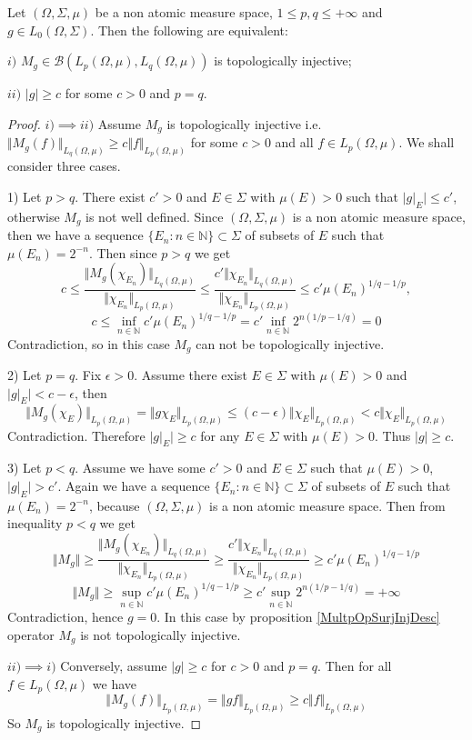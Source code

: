 \begin{proposition}\label{TopInjMultOpCharacOnNonAtomMeasSp} Let $(\Omega,\Sigma,\mu)$ be a non atomic measure space, $1\leq p,q\leq +\infty$ and $g\in L_0(\Omega,\Sigma)$. Then the following are equivalent:

$i)$ $M_g\in\mathcal{B}(L_p(\Omega,\mu),L_q(\Omega,\mu))$ is topologically injective;

$ii)$ $|g|\geq c$ for some $c>0$ and $p=q$.
\end{proposition}
\begin{proof}
$i)$$\implies$$ ii)$ Assume $M_g$ is topologically injective i.e. $\Vert M_g(f)\Vert_{L_q(\Omega,\mu)}\geq c\Vert f\Vert_{L_p(\Omega,\mu)}$ for some $c>0$ and all $f\in L_p(\Omega,\mu)$. We shall consider three cases.

1)  Let $p>q$. There exist $c'>0$ and $E\in\Sigma$ with $\mu(E)>0$ such that $|g|_E|\leq c'$, otherwise $M_g$ is not well defined. Since $(\Omega,\Sigma,\mu)$ is a non atomic measure space, then we have a sequence $\{E_n:n\in\mathbb{N}\}\subset\Sigma$ of subsets of $E$ such that $\mu(E_n)=2^{-n}$. Then since $p>q$ we get
$$
c
\leq\frac{\Vert M_g(\chi_{E_n})\Vert_{L_q(\Omega,\mu)}}{\Vert \chi_{E_n}\Vert_{L_p(\Omega,\mu)}}
\leq\frac{c'\Vert\chi_{E_n}\Vert_{L_q(\Omega,\mu)}}{\Vert \chi_{E_n}\Vert_{L_p(\Omega,\mu)}}
\leq c'\mu(E_n)^{1/q-1/p},
$$
$$
c
\leq\inf_{n\in\mathbb{N}}c'\mu(E_n)^{1/q-1/p}
=c'\inf_{n\in\mathbb{N}} 2^{n(1/p-1/q)}=0
$$
Contradiction, so in this case $M_g$ can not be topologically injective.

2) Let $p=q$. Fix $\epsilon > 0$. Assume there exist $E\in\Sigma$ with $\mu(E)>0$ and $|g|_{E}|<c-\epsilon$, then
$$
\Vert M_g(\chi_{E})\Vert_{L_p(\Omega,\mu)}
=\Vert g \chi_{E}\Vert_{L_p(\Omega,\mu)}
\leq (c-\epsilon) \Vert \chi_{E}\Vert_{L_p(\Omega,\mu)}
<c\Vert \chi_{E}\Vert_{L_p(\Omega,\mu)}
$$
Contradiction. Therefore $|g|_E|\geq c$ for any $E\in\Sigma$ with $\mu(E)>0$. Thus $|g|\geq c$.

3) Let $p<q$. Assume we have some $c'>0$ and $E\in\Sigma$ such that $\mu(E)>0$, $|g|_E|>c'$. Again we have a sequence  $\{E_n:n\in\mathbb{N}\}\subset\Sigma$ of subsets of $E$ such that $\mu(E_n)=2^{-n}$, because $(\Omega,\Sigma,\mu)$ is a non atomic measure space. Then from inequality $p<q$ we get
$$
\Vert M_g\Vert
\geq\frac{\Vert M_g(\chi_{E_n})\Vert_{L_q(\Omega,\mu)}}{\Vert \chi_{E_n}\Vert_{L_p(\Omega,\mu)}}
\geq\frac{c'\Vert\chi_{E_n}\Vert_{L_q(\Omega,\mu)}}{\Vert \chi_{E_n}\Vert_{L_p(\Omega,\mu)}}
\geq c'\mu(E_n)^{1/q-1/p}
$$
$$
\Vert M_g\Vert
\geq\sup_{n\in\mathbb{N}}c'\mu(E_n)^{1/q-1/p}
\geq c'\sup_{n\in\mathbb{N}}2^{n(1/p-1/q)}
=+\infty
$$
Contradiction, hence $g=0$. In this case by proposition \ref{MultpOpSurjInjDesc} operator $M_g$ is not topologically injective.

$ii)$$\implies$$ i)$ Conversely, assume $|g|\geq c$ for $c>0$ and $p=q$. Then for all $f\in L_p(\Omega,\mu)$ we have
$$
\Vert M_g(f)\Vert_{L_p(\Omega,\mu)}
=\Vert g f\Vert_{L_p(\Omega,\mu)}
\geq c\Vert f\Vert_{L_p(\Omega,\mu)}
$$
So $M_g$ is topologically injective.
\end{proof}

